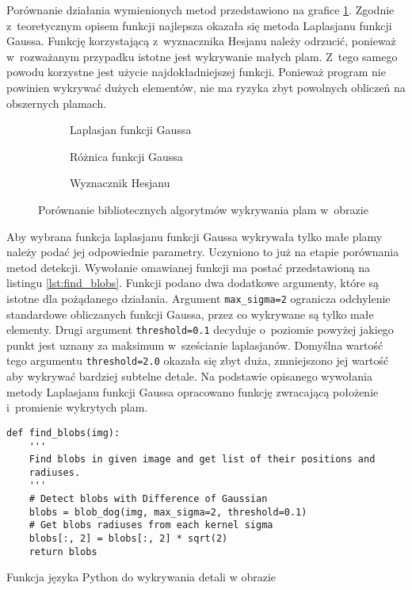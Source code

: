 Porównanie działania wymienionych metod przedstawiono na grafice
\ref{fig:blobcompare}.
Zgodnie z~teoretycznym opisem funkcji najlepsza okazała się metoda
Laplasjanu funkcji Gaussa.
Funkcję korzystającą z~wyznacznika Hesjanu należy odrzucić, ponieważ
w~rozważanym przypadku istotne jest wykrywanie małych plam.
Z~tego samego powodu korzystne jest użycie najdokładniejszej funkcji.
Ponieważ program nie powinien wykrywać dużych elementów, nie ma ryzyka zbyt
powolnych obliczeń na obszernych plamach.
\begin{figure}[htbp]
	\centering
	\begin{subfigure}[t]{0.3\textwidth}
		\centering
		
		\caption{Laplasjan funkcji Gaussa}
	\end{subfigure}
	\hfill
	\begin{subfigure}[t]{0.3\textwidth}
		\centering
		
		\caption{Różnica funkcji Gaussa}
	\end{subfigure}
	\hfill
	\begin{subfigure}[t]{0.3\textwidth}
		\centering
		
		\caption{Wyznacznik Hesjanu}
	\end{subfigure}
	\caption{Porównanie bibliotecznych algorytmów wykrywania plam w~obrazie}
	\label{fig:blobcompare}
\end{figure}

Aby wybrana funkcja laplasjanu funkcji Gaussa wykrywała tylko małe plamy
należy podać jej odpowiednie parametry.
Uczyniono to już na etapie porównania metod detekcji.
Wywołanie omawianej funkcji ma postać przedstawioną na listingu
\ref{lst:find_blobs}.
Funkcji podano dwa dodatkowe argumenty, które są istotne dla pożądanego
działania.
Argument \texttt{max_sigma=2} ogranicza odchylenie standardowe
obliczanych funkcji Gaussa, przez co wykrywane są tylko małe elementy.
Drugi argument \texttt{threshold=0.1} decyduje o~poziomie
powyżej jakiego punkt jest uznany za maksimum w~sześcianie laplasjanów.
Domyślna wartość tego argumentu \texttt{threshold=2.0} okazała 
się zbyt duża, zmniejszono jej wartość aby wykrywać bardziej subtelne detale.
Na podstawie opisanego wywołania metody Laplasjanu funkcji Gaussa
opracowano funkcję zwracającą położenie i~promienie wykrytych plam.
\begin{listing}[htbp]
\begin{verbatim}
def find_blobs(img):
    '''
    Find blobs in given image and get list of their positions and 
    radiuses.
    '''
    # Detect blobs with Difference of Gaussian
    blobs = blob_dog(img, max_sigma=2, threshold=0.1)
    # Get blobs radiuses from each kernel sigma
    blobs[:, 2] = blobs[:, 2] * sqrt(2)
    return blobs
\end{verbatim}
\caption{Funkcja języka Python do wykrywania detali w obrazie}
\label{lst:find_blobs}
\end{listing}

